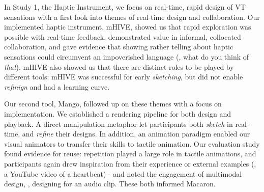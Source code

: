 In Study 1, the Haptic Instrument, we focus on real-time, rapid design of VT sensations with a first look into themes of real-time design and collaboration.
Our implemented haptic instrument, mHIVE, showed us that rapid exploration was possible with real-time feedback, demonstrated value in informal, collocated collaboration, and gave evidence that showing rather telling about haptic sensations could circumvent an impoverished language (\eg, what do you think of \emph{that}).
 mHIVE also showed us that there are distinct roles to be played by different tools: mHIVE was successful for early \emph{sketching}, but did not enable \emph{refinign} and had a learning curve.


Our second tool, Mango, followed up on these themes with a focus on implementation.
We established a rendering pipeline for both design and playback.
A direct-manipulation metaphor let participants both \emph{sketch} in real-time, and \emph{refine} their designs.
In addition, an animation paradigm enabled our visual animators to transfer their skills to tactile animation.
Our evaluation study found evidence for reuse: repetition played a large role in tactile animations, and participants again drew inspiration from their experience or external examples (\eg, a YouTube video of a heartbeat) - and noted the engagement of multimodal design, \eg, designing for an audio clip.
These both informed Macaron.


